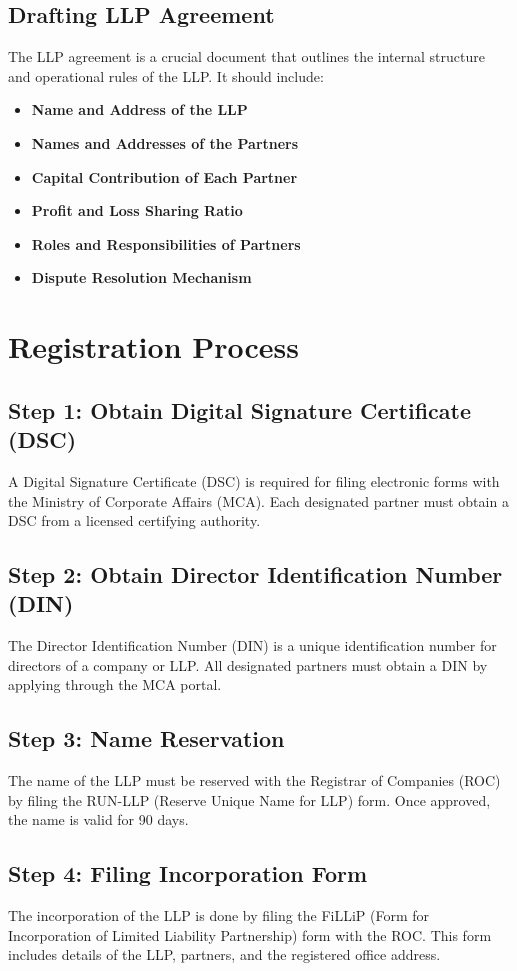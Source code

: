 \documentclass{article}
\begin{document}
\section{Drafting LLP Agreement}
The LLP agreement is a crucial document that outlines the internal structure and operational rules of the LLP. It should include:
\begin{itemize}
    \item \textbf{Name and Address of the LLP}
    \item \textbf{Names and Addresses of the Partners}
    \item \textbf{Capital Contribution of Each Partner}
    \item \textbf{Profit and Loss Sharing Ratio}
    \item \textbf{Roles and Responsibilities of Partners}
    \item \textbf{Dispute Resolution Mechanism}
\end{itemize}

\chapter{Registration Process}
\section{Step 1: Obtain Digital Signature Certificate (DSC)}
A Digital Signature Certificate (DSC) is required for filing electronic forms with the Ministry of Corporate Affairs (MCA). Each designated partner must obtain a DSC from a licensed certifying authority.

\section{Step 2: Obtain Director Identification Number (DIN)}
The Director Identification Number (DIN) is a unique identification number for directors of a company or LLP. All designated partners must obtain a DIN by applying through the MCA portal.

\section{Step 3: Name Reservation}
The name of the LLP must be reserved with the Registrar of Companies (ROC) by filing the RUN-LLP (Reserve Unique Name for LLP) form. Once approved, the name is valid for 90 days.

\section{Step 4: Filing Incorporation Form}
The incorporation of the LLP is done by filing the FiLLiP (Form for Incorporation of Limited Liability Partnership) form with the ROC. This form includes details of the LLP, partners, and the registered office address.
\end{document}
